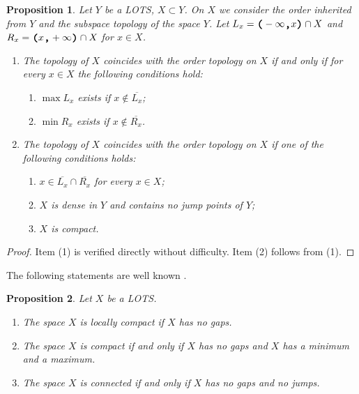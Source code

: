 \documentclass[preprint]{elsarticle}
\def\cl#1{\overline{#1}}
\newtheorem{proposition}{Proposition}[section]
\theoremstyle{definition}
\theoremstyle{remark}
\def\ilcomma/{\boldsymbol{,}}
\def\ilsymlp{\boldsymbol{(}}
\def\ilsymrp{\boldsymbol{)}}
\def\ilfont#1{\boldsymbol{#1}}
\def\ilfontX#1{\mathrm{\text{\texttt{\textbf{\large #1}}}}}
\def\ilfontX#1{{\text{\texttt{\textbf{\large \upshape #1}}}}}
\def\ilfont#1{\raisebox{-1.2pt}{\ilfontX{#1}}}
\def\ilfontC#1{\raisebox{-0.7pt}{\ilfontX{#1}}}
\def\ilcomma/{\ilfontC{,}}
\def\ilsymlp{\ilfont{(}}
\def\ilsymrp{\ilfont{)}}
\def\ilpp(#1,#2){\ilsymlp#1\ilcomma/ #2\ilsymrp}
\begin{document}
\begin{proposition}\label{p:1+0a}
Let $Y$ be a LOTS, $X\subset Y$.
On $X$ we consider the order inherited from $Y$ and the subspace topology of the space $Y$.
Let $L_x=\ilpp(-\infty,x)\cap X$ and $R_x=\ilpp(x,+\infty)\cap X$ for $x\in X$.
\begin{enumerate}
\item
The topology of $X$ coincides with the order topology on $X$ if and only if
for every $x\in X$ the following conditions hold:
\begin{enumerate}
\item
$\max L_x$ exists if $x\notin\cl{L_x}$;
\item
$\min R_x$ exists if $x\notin\cl{R_x}$.
\end{enumerate}
\item
The topology of $X$ coincides with the order topology on $X$ if
one of the following conditions holds:
\begin{enumerate}
\item
$x\in \cl{L_x}\cap \cl{R_x}$ for every $x\in X$;
\item
$X$ is dense in $Y$ and contains no jump points of $Y$;
\item
$X$ is compact.
\end{enumerate}
\end{enumerate}
\end{proposition}
\begin{proof}
Item (1) is verified directly without difficulty. Item (2) follows from (1).
\end{proof}

The following statements are well known \cite{Nagata1985}.

\begin{proposition}\label{p:1+4}
Let $X$ be a LOTS.
\begin{enumerate}
\item
The space $X$ is locally compact if $X$ has no gaps.
\item
The space $X$ is compact if and only if $X$ has no gaps and $X$ has a minimum and a maximum.
\item
The space $X$ is connected if and only if $X$ has no gaps and no jumps.
\end{enumerate}
\end{proposition}
\end{document}
